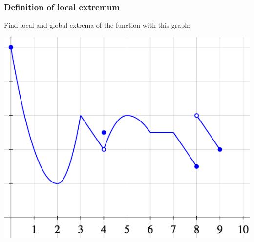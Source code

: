\documentclass[14pt]{beamer}
\date{}
\title{}
\author{}
\begin{document}


	\begin{frame}
		\frametitle{Definition of local extremum}

		Find local and global extrema of the function with this graph:

		\begin{center}
			\includegraphics[scale=.42]{G13}
		\end{center}
	\end{frame}
\end{document}
